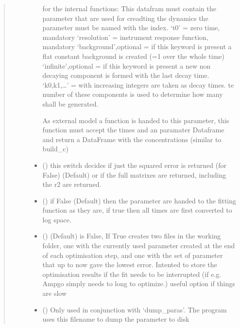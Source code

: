\documentclass[letterpaper,10pt,english]{sphinxmanual}
\begin{document}
\begin{fulllineitems}
\begin{quote}
\begin{description}
\begin{itemize}
for the internal functions:
This datafram must contain the parameter that are used for creadting the dynamics
the parameter must be named with the index.
‘t0’ = zero time, mandatory
‘resolution’ = instrument response function, mandatory
‘background’,optional = if this keyword is present a flat constant background is created (=1 over the whole time)
‘infinite’,optional = if this keyword is present a new non decaying component is formed with the last decay time.
‘k0,k1,…’ = with increasing integers are taken as decay times. te number of these components is used to determine how many shall be generated.

As external model a function is handed to this parameter, this function
must accept the times and an paramater Dataframe and return a DataFrame
with the concentrations (similar to build\_c)


\item {} 
 (\sphinxstyleliteralemphasis{\sphinxupquote{, }}) \textendash{} this switch decides if just the squared error is returned (for False) (Default) or if the full
matrixes are returned, including the r2 are returned.

\item {} 
 (\sphinxstyleliteralemphasis{\sphinxupquote{, }}) \textendash{} if False (Default) then the parameter are handed to the fitting function as they are, if true
then all times are first converted to log space.

\item {} 
 (\sphinxstyleliteralemphasis{\sphinxupquote{, }}) \textendash{} (Default) is False, If True creates two files in the working folder, one with the
currently used parameter created at the end of each optimisation step, and one with
the set of parameter that up to now gave the lowest error. Intented to store
the optimisation results if the fit needs to be interrupted
(if e.g. Ampgo simply needs to long to optimize.) useful option if things are slow

\item {} 
 (\sphinxstyleliteralemphasis{\sphinxupquote{, }}) \textendash{} Only used in conjunction with ‘dump\_paras’. The program uses this filename to dump the
parameter to disk


\end{itemize}
\end{description}
\end{quote}
\end{fulllineitems}
\end{document}

